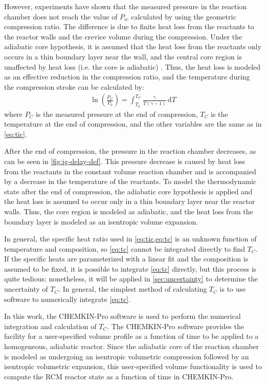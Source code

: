 \documentclass[../main.tex]{subfiles}
\begin{document}
However, experiments have shown that the measured pressure in the reaction chamber
does not reach the value of $P_{ic}$ calculated by using the geometric
compression ratio. The difference is due to finite heat loss from the
reactants to the reactor walls and the crevice volume during the
compression. Under the adiabatic core hypothesis, it is assumed that
the heat loss from the reactants only occurs in a thin boundary layer
near the wall, and the central core region is unaffected by heat loss
(i.e. the core is adiabatic) \cite{Desgroux1995}. Thus, the heat
loss is modeled as an effective reduction in the compression ratio, and
the temperature during the compression stroke can be calculated by:
%
\begin{align}
\ln\left(\frac{P_{C}}{P_0}\right) = \int_{T_0}^{T_{C}} \! \frac{\gamma}{T\left(\gamma-1\right)} \, \mathrm{d} T
\label{eq:tc}
\end{align}
%
where $P_C$ is the measured pressure at the end of compression, $T_C$
is the temperature at the end of compression, and the other variables
are the same as in \cref{eq:tic}.

After the end of compression, the pressure in the reaction chamber
decreases, as can be seen in \cref{fig:ig-delay-def}. This pressure
decrease is caused by heat loss from the reactants in the constant volume reaction
chamber and is accompanied by a decrease in the temperature of the
reactants. To model the thermodynamic state after the end of compression,
the adiabatic core hypothesis is applied and the heat loss is
assumed to occur only in a thin boundary layer near the reactor walls.
Thus, the core region is modeled as adiabatic, and the heat loss
from the boundary layer is modeled as an isentropic volume
expansion.

In general, the specific heat ratio used in \cref{eq:tic,eq:tc} is an
unknown function of temperature and composition, so \cref{eq:tc}
cannot be integrated directly to find $T_C$. If the specific heats are
parameterized with a linear fit and the composition is assumed to be
fixed, it is possible to integrate \cref{eq:tc} directly, but this
process is quite tedious; nonetheless, it will be applied in
\cref{sec:uncertainty} to determine the uncertainty of $T_C$. In
general, the simplest method of calculating $T_C$ is to use software
to numerically integrate \cref{eq:tc}.

In this work, the CHEMKIN-Pro \cite{Chemkin2012} software is used to
perform the numerical integration and calculation of $T_C$. The
CHEMKIN-Pro software provides the facility for a user-specified
volume profile as a function of time to be applied to a homogeneous,
adiabatic reactor. Since the adiabatic core of the reaction chamber
is modeled as undergoing an isentropic volumetric compression followed
by an isentropic volumetric expansion, this user-specified volume
functionality is used to compute the RCM reactor state as a function
of time in CHEMKIN-Pro.
\end{document}
